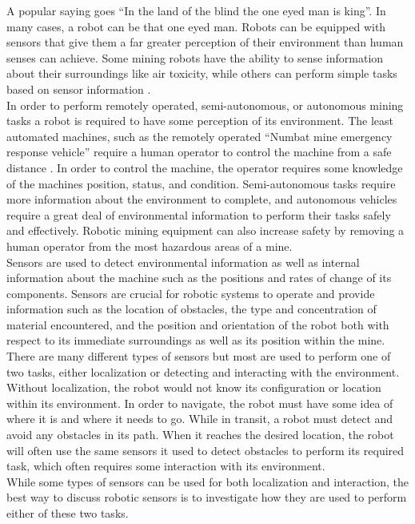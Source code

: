 A popular saying goes ``In the land of the blind the one eyed man is king''. In many cases, a robot can be that one eyed man. Robots can be equipped with sensors that give them a far greater perception of their environment than human senses can achieve. Some mining robots have the ability to sense information about their surroundings like air toxicity, while others can perform simple tasks based on sensor information \cite{uground}.\\

In order to perform remotely operated, semi-autonomous, or autonomous mining tasks a robot is required to have some perception of its environment. The least automated machines, such as the remotely operated ``Numbat mine emergency response vehicle'' require a human operator to control the machine from a safe distance \cite{numbat}. In order to control the machine, the operator requires some knowledge of the machines position, status, and condition. Semi-autonomous tasks require more information about the environment to complete, and autonomous vehicles require a great deal of environmental information to perform their tasks safely and effectively. Robotic mining equipment can also increase safety by removing a human operator from the most hazardous areas of a mine.\\

Sensors are used to detect environmental information as well as internal information about the machine such as the positions and rates of change of its components. Sensors are crucial for robotic systems to operate and provide information such as the location of obstacles, the type and concentration of material encountered, and the position and orientation of the robot both with respect to its immediate surroundings as well as its position within the mine. There are many different types of sensors but most are used to perform one of two tasks, either localization or detecting and interacting with the environment. Without localization, the robot would not know its configuration or location within its environment. In order to navigate, the robot must have some idea of where it is and where it needs to go. While in transit, a robot must detect and avoid any obstacles in its path. When it reaches the desired location, the robot will often use the same sensors it used to detect obstacles to perform its required task, which often requires some interaction with its environment.\\

While some types of sensors can be used for both localization and interaction, the best way to discuss robotic sensors is to investigate how they are used to perform either of these two tasks.\\

